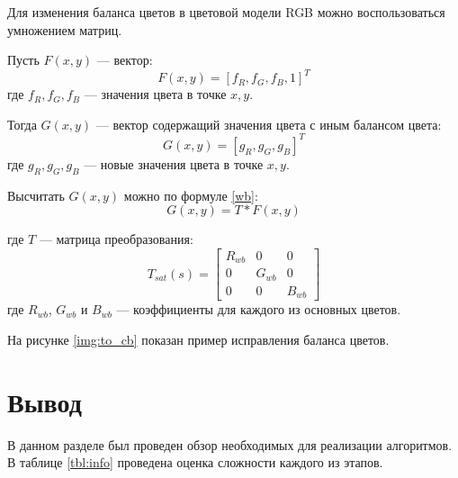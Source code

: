 Для изменения баланса цветов в цветовой модели RGB можно воспользоваться умножением матриц.

Пусть $F(x,y)$ --- вектор:
\begin{equation}
	\label{F}
	F(x,y) = [f_R, f_G, f_B, 1]^T
\end{equation}
где $f_R, f_G, f_B$ --- значения цвета в точке $x,y$.

Тогда $G(x,y)$ --- вектор содержащий значения цвета с иным балансом цвета:
\begin{equation}
	\label{G}
	G(x,y) = [g_R, g_G, g_B]^T
\end{equation}
где $g_R, g_G, g_B$ --- новые значения цвета в точке $x,y$.

Высчитать $G(x,y)$ можно по формуле \ref{wb}:
\begin{equation}
	\label{wb}
	G(x,y) = T * F(x,y)
\end{equation}

где $T$ --- матрица преобразования:
\begin{equation}
	\label{twb}
	T_{sat}(s) = \begin{bmatrix}
		R_{wb} & 0 & 0 \\
		0 & G_{wb} & 0 \\ 
		0 & 0 & B_{wb} 
	\end{bmatrix}
\end{equation}
где $R_{wb}$, $G_{wb}$ и $B_{wb}$ --- коэффициенты для каждого из основных цветов.

На рисунке \ref{img:to_cb} показан пример исправления баланса цветов.

\clearpage
\section*{Вывод}

В данном разделе был проведен обзор необходимых для реализации алгоритмов. В таблице \ref{tbl:info} проведена оценка сложности каждого из этапов.

\begin{table}[h]
	\begin{center}
		\caption{Используемая информация о изображении.}
		\label{tbl:info}
	\end{center}
\end{table}